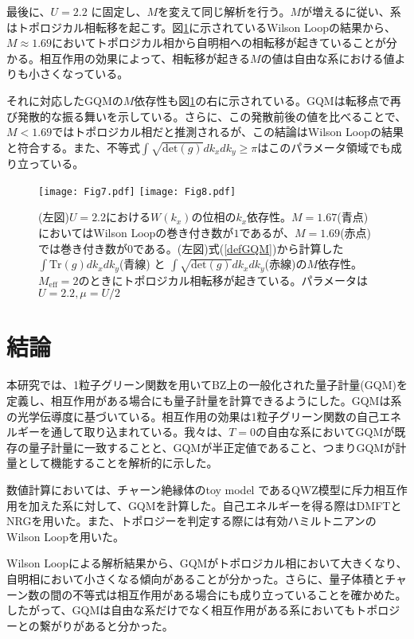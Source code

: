 \documentclass[12pt]{jsbook}
\newcommand{\trg}{\int \mathrm{Tr}(g)dk_xdk_y}
\newcommand{\detg}{\int \sqrt{\mathrm{det}(g)}dk_xdk_y}
\begin{document}
最後に、$U=2.2$ に固定し、$M$を変えて同じ解析を行う。$M$が増えるに従い、系はトポロジカル相転移を起こす。図\ref{fig:U=2.2_Wilson_GQM}に示されているWilson Loopの結果から、$M\approx 1.69$においてトポロジカル相から自明相への相転移が起きていることが分かる。相互作用の効果によって、相転移が起きる$M$の値は自由な系における値よりも小さくなっている。

それに対応したGQMの$M$依存性も図\ref{fig:U=2.2_Wilson_GQM}の右に示されている。GQMは転移点で再び発散的な振る舞いを示している。さらに、この発散前後の値を比べることで、$M<1.69$ではトポロジカル相だと推測されるが、この結論はWilson Loopの結果と符合する。また、不等式$\detg \geq \pi$はこのパラメータ領域でも成り立っている。


\begin{figure}
\centering
\texttt{[image: Fig7.pdf]}
\texttt{[image: Fig8.pdf]}
\caption{(左図)$U=2.2$における$W(k_x)$の位相の$k_x$依存性。$M=1.67$(青点)においてはWilson Loopの巻き付き数が$1$であるが、$M=1.69$(赤点)では巻き付き数が$0$である。(左図)式(\ref{defGQM})から計算した$\trg$(青線) と $\detg$(赤線)の$M$依存性。$M_{\mathrm{eff}}=2$のときにトポロジカル相転移が起きている。パラメータは$U=2.2,\mu = U/2$}
\label{fig:U=2.2_Wilson_GQM}
\end{figure}

\chapter{結論}
本研究では、1粒子グリーン関数を用いてBZ上の一般化された量子計量(GQM)を定義し、相互作用がある場合にも量子計量を計算できるようにした。GQMは系の光学伝導度に基づいている。相互作用の効果は1粒子グリーン関数の自己エネルギーを通して取り込まれている。我々は、$T=0$の自由な系においてGQMが既存の量子計量に一致することと、GQMが半正定値であること、つまりGQMが計量として機能することを解析的に示した。

数値計算においては、チャーン絶縁体のtoy model であるQWZ模型に斥力相互作用を加えた系に対して、GQMを計算した。自己エネルギーを得る際はDMFTとNRGを用いた。また、トポロジーを判定する際には有効ハミルトニアンのWilson Loopを用いた。

Wilson Loopによる解析結果から、GQMがトポロジカル相において大きくなり、自明相において小さくなる傾向があることが分かった。さらに、量子体積とチャーン数の間の不等式は相互作用がある場合にも成り立っていることを確かめた。したがって、GQMは自由な系だけでなく相互作用がある系においてもトポロジーとの繋がりがあると分かった。
\end{document}
